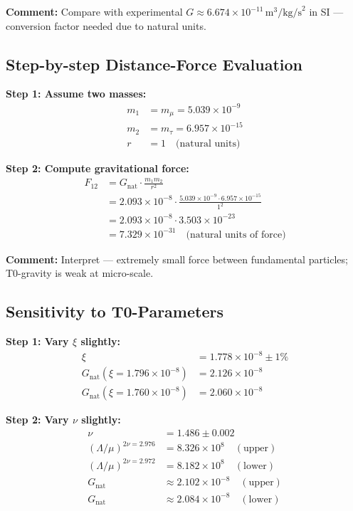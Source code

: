 \documentclass[12pt,a4paper]{article}
\newcommand{\xipar}{\xi}            %
\newcommand{\nulep}{\nu}            %
\begin{document}
\textbf{Comment:} Compare with experimental $G \approx 6.674 \times 10^{-11} \, \text{m}^3/\text{kg/s}^2$ in SI — conversion factor needed due to natural units.

\subsection{Step-by-step Distance-Force Evaluation}

\textbf{Step 1: Assume two masses:}
\begin{align}
	m_1 &= m_\mu = 5.039 \times 10^{-9} \\
	m_2 &= m_\tau = 6.957 \times 10^{-15} \\
	r &= 1 \quad \text{(natural units)}
\end{align}

\textbf{Step 2: Compute gravitational force:}
\begin{align}
	F_{12} &= G_{\text{nat}} \cdot \frac{m_1 m_2}{r^2} \\
	&= 2.093 \times 10^{-8} \cdot \frac{5.039 \times 10^{-9} \cdot 6.957 \times 10^{-15}}{1^2} \\
	&= 2.093 \times 10^{-8} \cdot 3.503 \times 10^{-23} \\
	&= 7.329 \times 10^{-31} \quad \text{(natural units of force)}
\end{align}

\textbf{Comment:} Interpret — extremely small force between fundamental particles; T0-gravity is weak at micro-scale.

\subsection{Sensitivity to T0-Parameters}

\textbf{Step 1: Vary $\xipar$ slightly:}
\begin{align}
	\xipar &= 1.778 \times 10^{-8} \pm 1\% \\
	G_{\text{nat}}(\xipar = 1.796 \times 10^{-8}) &= 2.126 \times 10^{-8} \\
	G_{\text{nat}}(\xipar = 1.760 \times 10^{-8}) &= 2.060 \times 10^{-8}
\end{align}

\textbf{Step 2: Vary $\nulep$ slightly:}
\begin{align}
	\nulep &= 1.486 \pm 0.002 \\
	(\Lambda/\mu)^{2\nulep = 2.976} &= 8.326 \times 10^8 \quad (\text{upper}) \\
	(\Lambda/\mu)^{2\nulep = 2.972} &= 8.182 \times 10^8 \quad (\text{lower}) \\
	G_{\text{nat}} &\approx 2.102 \times 10^{-8} \quad (\text{upper}) \\
	G_{\text{nat}} &\approx 2.084 \times 10^{-8} \quad (\text{lower})
\end{align}
\end{document}
